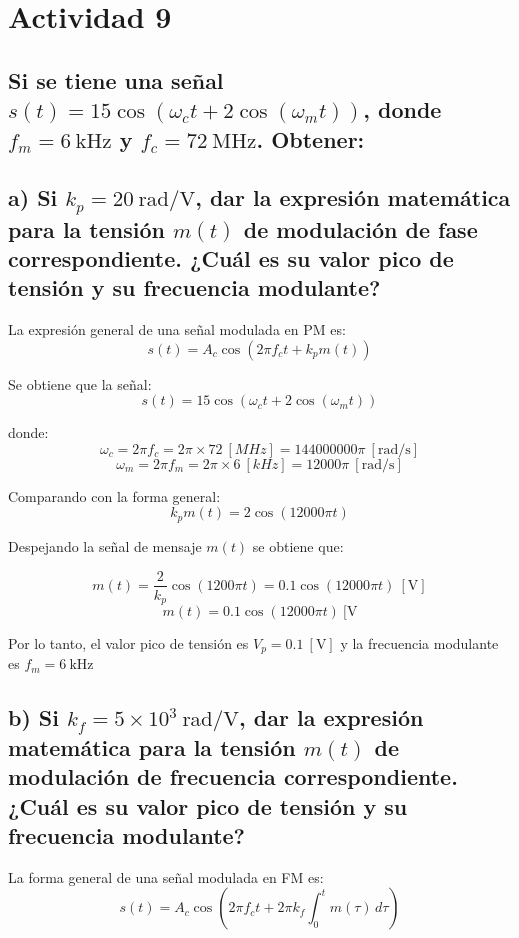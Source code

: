 \section{Actividad 9}

\subsection*{Si se tiene una señal $s(t) = 15\cos(\omega_c t + 2\cos(\omega_m t))$, donde \( f_m = 6~\text{kHz} \) y \( f_c = 72~\text{MHz} \). Obtener:}

\subsection*{a) Si \( k_p = 20~\text{rad/V} \), dar la expresión matemática para la tensión \( m(t) \) de modulación de fase correspondiente. ¿Cuál es su valor pico de tensión y su frecuencia modulante?}

La expresión general de una señal modulada en PM es:
    \[
        s(t) = A_c \cos(2\pi f_c t + k_p m(t))
    \]

Se obtiene que la señal:
    \[
        s(t) = 15\cos(\omega_c t + 2\cos(\omega_m t))
    \]

donde:
    \[
      \omega_c = 2\pi f_c = 2\pi\times72~[MHz] = 144000000\pi~[\text{rad/s}]
    \]
    \[
        \omega_m = 2\pi f_m = 2\pi \times 6~[kHz] = 12000\pi~[\text{rad/s}]
    \]

Comparando con la forma general:
    \[
        k_p m(t) = 2\cos(12000\pi t)
    \]
    
Despejando la señal de mensaje $m(t)$ se obtiene que:
    
    \[
        m(t) = \frac{2}{k_p}\cos(1200\pi t) = 0.1\cos(12000\pi t)~[\text{V}]
    \]
    \[
        m(t) = 0.1\cos(12000\pi t)~[\text{V}
    \]

Por lo tanto, el valor pico de tensión es $V_p = 0.1~[\text{V}]$ y la frecuencia modulante es $f_m = 6~\text{kHz}$

\subsection*{b) Si $k_f = 5\times10^3~\text{rad/V}$, dar la expresión matemática para la tensión $m(t)$ de modulación de frecuencia correspondiente. ¿Cuál es su valor pico de tensión y su frecuencia modulante?}

La forma general de una señal modulada en FM es:
\[
s(t) = A_c \cos\left(2\pi f_c t + 2\pi k_f \int_0^t m(\tau)\,d\tau \right)
\]

